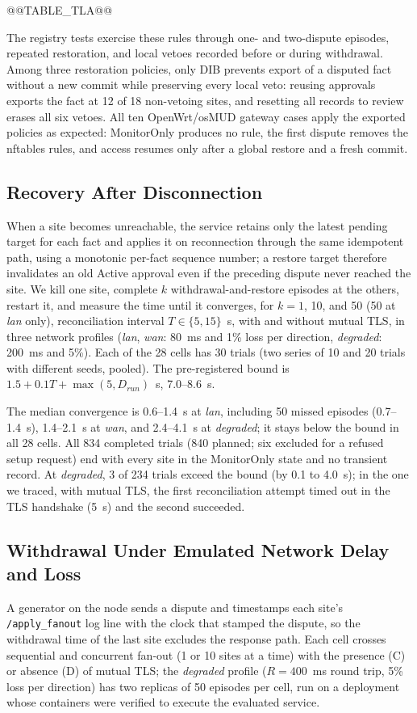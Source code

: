 @@TABLE_TLA@@

The registry tests exercise these rules through one- and two-dispute episodes, repeated restoration, and local vetoes recorded before or during withdrawal. Among three restoration policies, only DIB prevents export of a disputed fact without a new commit while preserving every local veto: reusing approvals exports the fact at 12 of 18 non-vetoing sites, and resetting all records to review erases all six vetoes. All ten OpenWrt/osMUD gateway cases apply the exported policies as expected: MonitorOnly produces no rule, the first dispute removes the nftables rules, and access resumes only after a global restore and a fresh commit.

\subsection{Recovery After Disconnection}
\label{sec:scalability-results}
When a site becomes unreachable, the service retains only the latest pending target for each fact and applies it on reconnection through the same idempotent path, using a monotonic per-fact sequence number; a restore target therefore invalidates an old Active approval even if the preceding dispute never reached the site. We kill one site, complete $k$ withdrawal-and-restore episodes at the others, restart it, and measure the time until it converges, for $k=1$, 10, and 50 (50 at \emph{lan} only), reconciliation interval $T\in\{5,15\}$~s, with and without mutual TLS, in three network profiles (\emph{lan}, \emph{wan}: 80~ms and 1\% loss per direction, \emph{degraded}: 200~ms and 5\%). Each of the 28 cells has 30 trials (two series of 10 and 20 trials with different seeds, pooled). The pre-registered bound is $1.5+0.1T+\max(5,D_{run})$~s, 7.0--8.6~s.

The median convergence is 0.6--1.4~s at \emph{lan}, including 50 missed episodes (0.7--1.4~s), 1.4--2.1~s at \emph{wan}, and 2.4--4.1~s at \emph{degraded}; it stays below the bound in all 28 cells. All 834 completed trials (840 planned; six excluded for a refused setup request) end with every site in the MonitorOnly state and no transient record. At \emph{degraded}, 3 of 234 trials exceed the bound (by 0.1 to 4.0~s); in the one we traced, with mutual TLS, the first reconciliation attempt timed out in the TLS handshake (5~s) and the second succeeded.

\subsection{Withdrawal Under Emulated Network Delay and Loss}
\label{sec:netem-results}
A generator on the node sends a dispute and timestamps each site's \texttt{/apply\_fanout} log line with the clock that stamped the dispute, so the withdrawal time of the last site excludes the response path. Each cell crosses sequential and concurrent fan-out (1 or 10 sites at a time) with the presence (C) or absence (D) of mutual TLS; the \emph{degraded} profile ($R=400$~ms round trip, 5\% loss per direction) has two replicas of 50 episodes per cell, run on a deployment whose containers were verified to execute the evaluated service.

